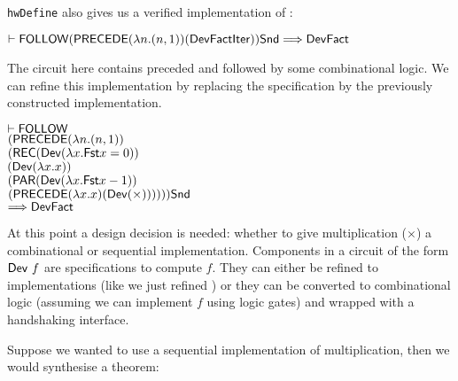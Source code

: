\documentclass{llncs}
\begin{document}
\vspace*{-2mm}

\noindent \texttt{hwDefine} also gives us a verified implementation of
:

\vspace*{-2mm}

{\baselineskip10pt\begin{alltt}
\( \vdash \DEF{FOLLOW} (\DEF{PRECEDE} ({\lambda}n. (n,1)) (\DEF{Dev} \DEF{FactIter})) \DEF{Snd} \Longrightarrow \DEF{Dev} \DEF{Fact} \)
\end{alltt}}

\vspace*{-2mm}

\noindent The circuit here contains  preceded and
followed by some combinational logic. We can refine this
implementation by replacing the specification
 by the previously constructed implementation.

\vspace*{-2mm}

{\baselineskip10pt\begin{alltt}
\( \vdash \DEF{FOLLOW}                                                                   \)
\(     (\DEF{PRECEDE} ({\lambda}n. (n,1))                                                \)
\(        (\DEF{REC} (\DEF{Dev} ({\lambda}x. \DEF{Fst} x = 0))                           \)
\(             (\DEF{Dev} ({\lambda}x. x))                                               \)
\(             (\DEF{PAR} (\DEF{Dev} ({\lambda}x. \DEF{Fst} x - 1))                      \)
\(                  (\DEF{PRECEDE} ({\lambda}x. x) (\DEF{Dev}({\times})))))) \DEF{Snd}   \)
\(    \Longrightarrow \DEF{Dev} \DEF{Fact}                                               \)
\end{alltt}}

\vspace*{-2mm}

At this point a design decision is needed: whether to give multiplication ($\times$)
a combinational or sequential implementation.
Components in a
circuit of the form $\mathsf{Dev}~f$ are specifications to compute
$f$. They can either be refined to implementations (like we just
refined ) or they can be converted to
combinational logic (assuming we can implement
$f$ using logic gates) and wrapped with a handshaking interface.

Suppose we wanted to use a sequential implementation of multiplication,
then we would synthesise a theorem:
\end{document}
